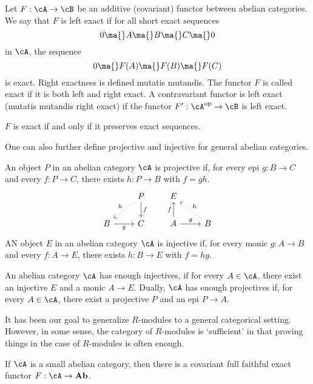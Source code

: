 \begin{dfn}
Let $F: \cA \rightarrow \cB$ be an additive (covariant) functor between abelian categories. We say that $F$ is left exact if for all short exact sequences
	\[
	0 \ma{} A \ma{} B \ma{} C \ma{} 0
	\]
in $\cA$, the sequence 
	\[
	0 \ma{} F(A) \ma{} F(B) \ma{} F(C)
	\]
is exact. Right exactness is defined mutatis mutandis. The functor $F$ is called exact if it is both left and right exact. A contravariant functor is left exact (mutatis mutandis right exact) if the functor $F': \cA^{\text{op}} \rightarrow \cB$ is left exact. 
\end{dfn}


\begin{prop}
$F$ is exact if and only if it preserves exact sequences. 
\end{prop}


One can also further define projective and injective for general abelian categories.

\begin{dfn}
An object $P$ in an abelian category $\cA$ is projective if, for every epi $g: B \to C$ and every $f: P \to C$, there exists $h: P \to B$ with $f=gh$.
	\[
	\begin{tikzcd}
	& P \arrow[dotted,swap]{dl}{h} \arrow{d}{f} \\
	B \arrow[swap]{r}{g} & C
	\end{tikzcd}\quad\quad\begin{tikzcd}
	E & \\
	A \arrow{u}{f} \arrow{r}{g} & B \arrow[dotted,swap]{ul}{h}
	\end{tikzcd}
	\]
AN object $E$ in an abelian category $\cA$ is injective if, for every monic $g: A \to B$ and every $f: A \to E$, there exists $h: B \to E$ with $f=hg$.
\end{dfn}


\begin{dfn}[Enough]
An abelian category $\cA$ has enough injectives, if for every $A \in \cA$, there exist an injective $E$ and a monic $A \to E$. Dually, $\cA$ has enough projectives if, for every $A \in \cA$, there exist a projective $P$ and an epi $P \to A$. 
\end{dfn}


It has been our goal to generalize $R$-modules to a general categorical setting. However, in some sense, the category of $R$-modules is `sufficient' in that proving things in the case of $R$-modules is often enough.


\begin{thm}
If $\cA$ is a small abelian category, then there is a covariant full faithful exact functor $F: \cA \to \textbf{Ab}$.
\end{thm}

